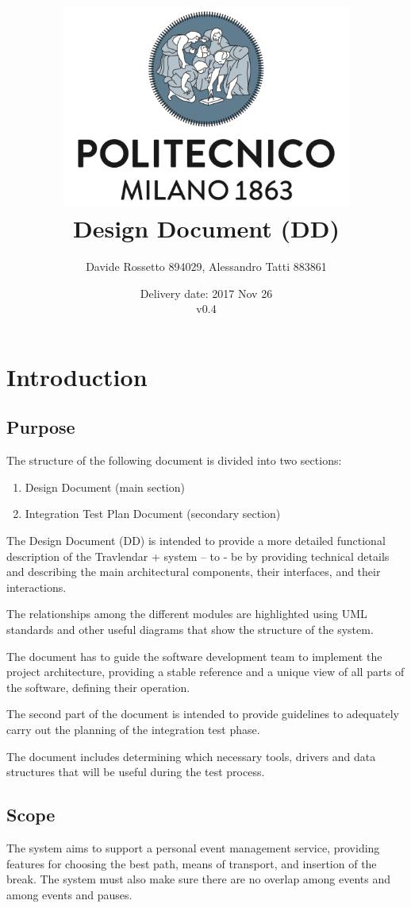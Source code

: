 \documentclass{article}
\title{ 
	\includegraphics[width=95mm]{img/PolimiLogo.png} \\
	\bigskip
	Design Document (DD)
}
\author{
	Davide Rossetto 894029, Alessandro Tatti 883861
}
\date{
	Delivery date: 2017 Nov 26\\
	\bigskip v0.4
}
\begin{document}
	
\maketitle
\newpage
\tableofcontents
\newpage
	
	
	\section{Introduction}
	

	
	\subsection{Purpose}
	The structure of the following document is divided into two sections:
	\begin{enumerate}
	\item Design Document (main section)
	\item Integration Test Plan Document (secondary section)
	\end{enumerate}

	\bigskip
	The Design Document (DD) is intended to provide a more detailed functional description of the Travlendar + system – to - be by providing technical details and describing the main architectural components, their interfaces, and their interactions.
	
	The relationships among the different modules are highlighted using UML standards and other useful diagrams that show the structure of the system.
	
	The document has to guide the software development team to implement the project architecture, providing a stable reference and a unique view of all parts of the software, defining their operation.

	\bigskip
	The second part of the document is intended to provide guidelines to adequately carry out the planning of the integration test phase.
	
	The document includes determining which necessary tools, drivers and data structures that will be useful during the test process.

	
	
	\subsection{Scope}
	The system aims to support a personal event management service, providing features for choosing the best path, means of transport, and insertion of the break. The system must also make sure there are no overlap among events and among events and pauses.
\end{document}
